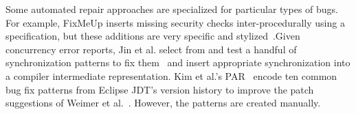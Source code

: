Some automated repair approaches are specialized for particular types of bugs. For example, FixMeUp inserts missing security checks inter-procedurally using a specification, but these additions are very specific and stylized~\cite{son2013fix}.Given concurrency error reports, Jin et al. select from and test a handful of synchronization patterns to fix them~\cite{JZDLL:12} and insert appropriate synchronization into a compiler intermediate representation. Kim et al.'s PAR~\cite{Kim2013:PAR} encode ten common bug fix patterns from Eclipse JDT's version history to improve the patch suggestions of Weimer et al.~\cite{Weimer2009:AFP}. However, the patterns are created manually. 

